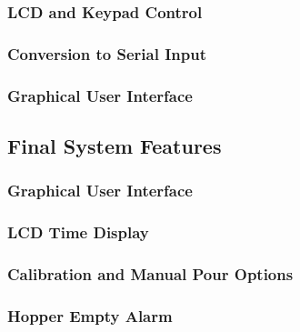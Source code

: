 \subsubsection{LCD and Keypad Control\label{sec:methedology:starveFeeder:userInterface:lcdAndKeypadControl}}

\subsubsection{Conversion to Serial Input\label{sec:methedology:starveFeeder:userInterface:conversionToSerialInput}}

\subsubsection{Graphical User Interface\label{sec:methedology:starveFeeder:userInterface:graphicalUserInterface}}

\subsection{Final System Features\label{sec:methedology:starveFeeder:finalSystemFeatures}}

\subsubsection{Graphical User Interface\label{sec:methedology:starveFeeder:finalSystemFeatures:graphicalUserInterface}}

\subsubsection{LCD Time Display\label{sec:methedology:starveFeeder:finalSystemFeatures:lcdTimeDisplay}}

\subsubsection{Calibration and Manual Pour Options\label{sec:methedology:starveFeeder:finalSystemFeatures:calibrationAndManualPourOptions}}

\subsubsection{Hopper Empty Alarm\label{sec:methedology:starveFeeder:finalSystemFeatures:hopperEmptyAlarm}}
